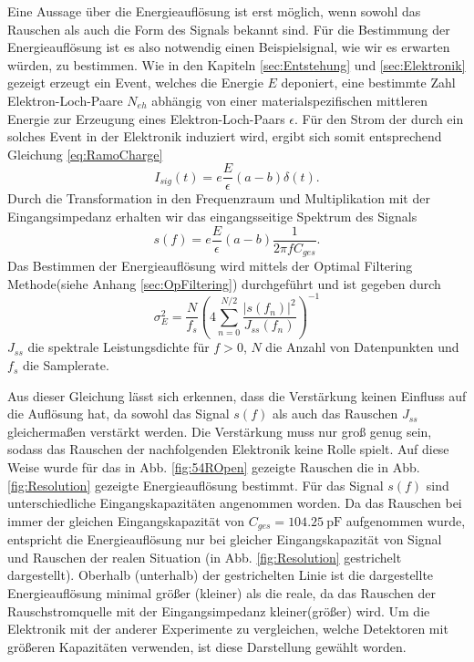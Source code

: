 Eine Aussage über die Energieauflösung ist erst möglich, wenn sowohl das Rauschen als auch die Form des Signals bekannt sind.
Für die Bestimmung der Energieauflösung ist es also notwendig einen Beispielsignal, wie wir es erwarten würden, zu bestimmen.
Wie in den Kapiteln \ref{sec:Entstehung} und \ref{sec:Elektronik} gezeigt erzeugt ein Event, welches die Energie $E$ deponiert, eine bestimmte Zahl Elektron-Loch-Paare $N_{eh}$ abhängig von einer materialspezifischen mittleren Energie zur Erzeugung eines Elektron-Loch-Paars $\epsilon$.
Für den Strom der durch ein solches Event in der Elektronik induziert wird, ergibt sich somit entsprechend Gleichung \eqref{eq:RamoCharge}
\begin{equation}
I_{sig}(t) = e\frac{E}{\epsilon}(a-b)\delta (t).
\end{equation}
Durch die Transformation in den Frequenzraum und Multiplikation mit der Eingangsimpedanz erhalten wir das eingangsseitige Spektrum des Signals
\begin{equation}
s(f) = e\frac{E}{\epsilon}(a-b)\frac{1}{2\pi f C_{ges}}.
\end{equation}
Das Bestimmen der Energieauflösung wird mittels der Optimal Filtering Methode(siehe Anhang \ref{sec:OpFiltering}) durchgeführt und ist gegeben durch
\begin{equation}
\sigma^2_E = \frac{N}{f_s}\left(4\sum_{n=0}^{N/2}\frac{|s(f_n)|^2}{J_{ss}(f_n)}\right)^{-1}
\label{eq:OptFilt}
\end{equation}
$J_{ss}$ die spektrale Leistungsdichte für $f>0$, $N$ die Anzahl von Datenpunkten und $f_s$ die Samplerate.

Aus dieser Gleichung lässt sich erkennen, dass die Verstärkung keinen Einfluss auf die Auflösung hat, da sowohl das Signal $s(f)$ als auch das Rauschen $J_{ss}$ gleichermaßen verstärkt werden.
Die Verstärkung muss nur groß genug sein, sodass das Rauschen der nachfolgenden Elektronik keine Rolle spielt.
Auf diese Weise wurde für das in Abb. \ref{fig:54ROpen} gezeigte Rauschen die in Abb. \ref{fig:Resolution} gezeigte Energieauflösung bestimmt.
Für das Signal $s(f)$ sind unterschiedliche Eingangskapazitäten angenommen worden.
Da das Rauschen bei immer der gleichen Eingangskapazität von $C_{ges}=\SI{104,25}{\pico\farad}$ aufgenommen wurde, entspricht die Energieauflösung nur bei gleicher Eingangskapazität von Signal und Rauschen der realen Situation (in Abb. \ref{fig:Resolution} gestrichelt dargestellt).
Oberhalb (unterhalb) der gestrichelten Linie ist die dargestellte Energieauflösung minimal größer (kleiner) als die reale, da das Rauschen der Rauschstromquelle mit der Eingangsimpedanz kleiner(größer) wird.
Um die Elektronik mit der anderer Experimente zu vergleichen, welche Detektoren mit größeren Kapazitäten verwenden, ist diese Darstellung gewählt worden.

